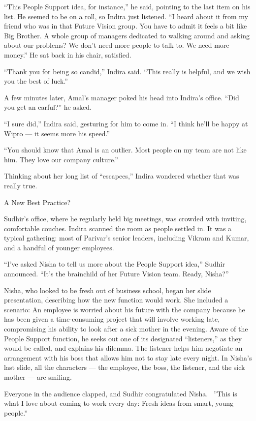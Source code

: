 \documentclass[10pt,a4paper]{book}
\begin{document}
\begin{multicols}{3}
{“This People Support idea, for instance,” he said, pointing to the last item on his list. He seemed to be on a roll, so Indira just listened. “I heard about it from my friend who was in that Future Vision group. You have to admit it feels a bit like Big Brother. A whole group of managers dedicated to walking around and asking about our problems? We don’t need more people to talk to. We need more money.” He sat back in his chair, satisfied.

“Thank you for being so candid,” Indira said. “This really is helpful, and we wish you the best of luck.”

A few minutes later, Amal’s manager poked his head into Indira’s office. “Did you get an earful?” he asked.

“I sure did,” Indira said, gesturing for him to come in. “I think he’ll be happy at Wipro — it seems more his speed.”

“You should know that Amal is an outlier. Most people on my team are not like him. They love our company culture.”

Thinking about her long list of “escapees,” Indira wondered whether that was really true.

A New Best Practice?

Sudhir’s office, where he regularly held big meetings, was crowded with inviting, comfortable couches. Indira scanned the room as people settled in. It was a typical gathering: most of Parivar’s senior leaders, including Vikram and Kumar, and a handful of younger employees.

“I’ve asked Nisha to tell us more about the People Support idea,” Sudhir announced. “It’s the brainchild of her Future Vision team. Ready, Nisha?”

Nisha, who looked to be fresh out of business school, began her slide presentation, describing how the new function would work. She included a scenario: An employee is worried about his future with the company because he has been given a time-consuming project that will involve working late, compromising his ability to look after a sick mother in the evening. Aware of the People Support function, he seeks out one of its designated “listeners,” as they would be called, and explains his dilemma. The listener helps him negotiate an arrangement with his boss that allows him not to stay late every night. In Nisha’s last slide, all the characters — the employee, the boss, the listener, and the sick mother — are smiling.

Everyone in the audience clapped, and Sudhir congratulated Nisha.  ”This is what I love about coming to work every day: Fresh ideas from smart, young people.”

}
\end{multicols}
\end{document}
